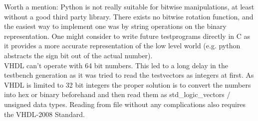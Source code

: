 Worth a mention: Python is not really suitable for bitwise manipulations, at least without
a good third party library. There exists no bitwise rotation function, and the easiest way
to implement one was by string operations on the binary representation.
One might consider to write future testprograms directly in C as it provides a more
accurate representation of the low level world (e.g. python abstracts the sign bit out of
the actual number). 
\\
VHDL can't operate with 64 bit numbers. This led to a long delay in the testbench
generation as it was tried to read the testvectors as integers at first. As VHDL is
limited to 32 bit integers the proper solution is to convert the numbers into hex or
binary beforehand and then read them as std_logic_vectors / unsigned data types.
Reading from file without any complications also requires the VHDL-2008 Standard. 
